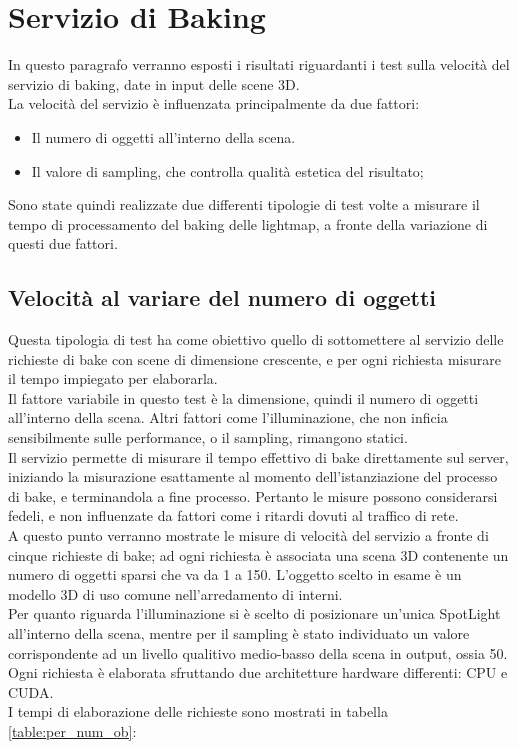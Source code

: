 \section{Servizio di Baking}
\label{sec:chapter_prove_sperimentali_servizio_baking}

In questo paragrafo verranno esposti i risultati riguardanti i test sulla velocità del servizio di baking, date in input delle scene 3D.
\\ 
La velocità del servizio è influenzata principalmente da due fattori:
\begin{itemize}
\item Il numero di oggetti all’interno della scena.
\item Il valore di sampling, che controlla qualità estetica del risultato;
\end{itemize}
Sono state quindi realizzate due differenti tipologie di test volte a misurare il tempo di processamento del baking delle lightmap, a fronte della variazione di questi due fattori.  

\subsection{Velocità al variare del numero di oggetti}
\label{sec:chapter_prove_sperimentali_servizio_baking_vel_obj}

Questa tipologia di test ha come obiettivo quello di sottomettere al servizio delle richieste di bake con scene di dimensione crescente, e per ogni richiesta misurare il tempo impiegato per elaborarla. 
\\
Il fattore variabile in questo test è la dimensione, quindi il numero di oggetti all’interno della scena. Altri fattori come l’illuminazione, che non inficia sensibilmente sulle performance, o il sampling, rimangono statici. 
\\
Il servizio permette di misurare il tempo effettivo di bake direttamente sul server, iniziando la misurazione esattamente al momento dell’istanziazione del processo di bake, e terminandola a fine processo. Pertanto le misure possono considerarsi fedeli, e non influenzate da fattori come i ritardi dovuti al traffico di rete. 
\\
A questo punto verranno mostrate le misure di velocità del servizio a fronte di cinque richieste di bake; ad ogni richiesta è associata una scena 3D contenente un numero di oggetti sparsi che va da 1 a 150. L’oggetto scelto in esame è un modello 3D di uso comune nell’arredamento di interni. 
\\
Per quanto riguarda l’illuminazione si è scelto di posizionare un’unica SpotLight all’interno della scena, mentre per il sampling è stato individuato un valore corrispondente ad un livello qualitivo medio-basso della scena in output, ossia 50. 
\\
Ogni richiesta è elaborata sfruttando due architetture hardware differenti: CPU e CUDA.
\\
I tempi di elaborazione delle richieste sono mostrati in tabella \ref{table:per_num_ob}:

